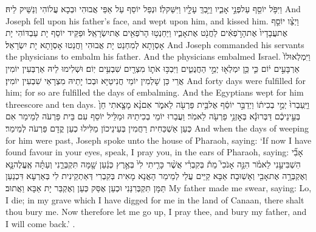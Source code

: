 \newperek
{}%
{וַיִּפֹּ֥ל יוֹסֵ֖ף עַל\maqqaf פְּנֵ֣י אָבִ֑יו וַיֵּ֥בְךְּ עָלָ֖יו וַיִּשַּׁק\maqqaf לֽוֹ׃}
{וּנְפַל יוֹסֵף עַל אַפֵּי אֲבוּהִי וּבְכָא עֲלוֹהִי וְנַשֵּׁיק לֵיהּ׃}
{And Joseph fell upon his father’s face, and wept upon him, and kissed him.}{}
{וַיְצַ֨ו יוֹסֵ֤ף אֶת\maqqaf עֲבָדָיו֙ אֶת\maqqaf הָרֹ֣פְאִ֔ים לַחֲנֹ֖ט אֶת\maqqaf אָבִ֑יו וַיַּחַנְט֥וּ הָרֹפְאִ֖ים אֶת\maqqaf יִשְׂרָאֵֽל׃}
{וּפַקֵּיד יוֹסֵף יָת עַבְדּוֹהִי יָת אָסְוָתָא לְמִחְנַט יָת אֲבוּהִי וַחֲנַטוּ אָסְוָתָא יָת יִשְׂרָאֵל׃}
{And Joseph commanded his servants the physicians to embalm his father. And the physicians embalmed Israel.}{}
{וַיִּמְלְאוּ\maqqaf לוֹ֙ אַרְבָּעִ֣ים י֔וֹם כִּ֛י כֵּ֥ן יִמְלְא֖וּ יְמֵ֣י הַחֲנֻטִ֑ים וַיִּבְכּ֥וּ אֹת֛וֹ מִצְרַ֖יִם שִׁבְעִ֥ים יֽוֹם׃}
{וּשְׁלִימוּ לֵיהּ אַרְבְּעִין יוֹמִין אֲרֵי כֵּן שָׁלְמִין יוֹמֵי חֲנִיטַיָּא וּבְכוֹ יָתֵיהּ מִצְרָאֵי שִׁבְעִין יוֹמִין׃}
{And forty days were fulfilled for him; for so are fulfilled the days of embalming. And the Egyptians wept for him threescore and ten days.}{}
{וַיַּֽעַבְרוּ֙ יְמֵ֣י בְכִית֔וֹ וַיְדַבֵּ֣ר יוֹסֵ֔ף אֶל\maqqaf בֵּ֥ית פַּרְעֹ֖ה לֵאמֹ֑ר אִם\maqqaf נָ֨א מָצָ֤אתִי חֵן֙ בְּעֵ֣ינֵיכֶ֔ם דַּבְּרוּ\maqqaf נָ֕א בְּאׇזְנֵ֥י פַרְעֹ֖ה לֵאמֹֽר׃}
{וַעֲבַרוּ יוֹמֵי בְכִיתֵיהּ וּמַלֵּיל יוֹסֵף עִם בֵּית פַּרְעֹה לְמֵימַר אִם כְּעַן אַשְׁכַּחִית רַחֲמִין בְּעֵינֵיכוֹן מַלִּילוּ כְעַן קֳדָם פַּרְעֹה לְמֵימַר׃}
{And when the days of weeping for him were past, Joseph spoke unto the house of Pharaoh, saying: ‘If now I have found favour in your eyes, speak, I pray you, in the ears of Pharaoh, saying:}{}
{אָבִ֞י הִשְׁבִּיעַ֣נִי לֵאמֹ֗ר הִנֵּ֣ה אָנֹכִי֮ מֵת֒ בְּקִבְרִ֗י אֲשֶׁ֨ר כָּרִ֤יתִי לִי֙ בְּאֶ֣רֶץ כְּנַ֔עַן שָׁ֖מָּה תִּקְבְּרֵ֑נִי וְעַתָּ֗ה אֶֽעֱלֶה\maqqaf נָּ֛א וְאֶקְבְּרָ֥ה אֶת\maqqaf אָבִ֖י וְאָשֽׁוּבָה׃}
{אַבָּא קַיֵּים עֲלַי לְמֵימַר הָאֲנָא מָאִית בְּקִבְרִי דְּאַתְקֵינִית לִי בְּאַרְעָא דִּכְנַעַן תַּמָּן תִּקְבְּרִנַּנִי וּכְעַן אֶסַּק כְּעַן וְאֶקְבַּר יָת אַבָּא וַאֲתוּב׃}
{My father made me swear, saying: Lo, I die; in my grave which I have digged for me in the land of Canaan, there shalt thou bury me. Now therefore let me go up, I pray thee, and bury my father, and I will come back.’ .}{}
